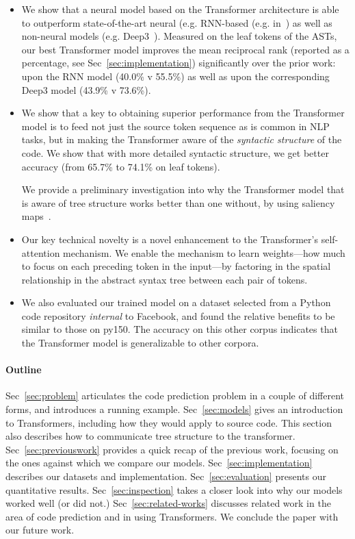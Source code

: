 \documentclass[nonacm, sigconf]{acmart}
\newcommand{\secref}[1]{Sec~\ref{#1}}
\begin{document}
\begin{itemize}
    \item We show that a neural model based on the Transformer architecture is able to outperform state-of-the-art neural (e.g. RNN-based (e.g. in~\cite{hellendoorn2017are-deep-best, karampatsis2020big-bpe}) as well as non-neural models (e.g. Deep3~\cite{raychev2016probabilistic-deep3-eth-dt}).  Measured on the leaf tokens of the ASTs, our best Transformer model improves the mean reciprocal rank (reported as a percentage, see Sec~\ref{sec:implementation}) significantly over the prior work: upon the RNN model (40.0\% v 55.5\%) as well as upon the corresponding Deep3 model (43.9\% v 73.6\%).
    
    \item We show that a key to obtaining superior performance from the Transformer model is to feed not just the source token sequence as is common in NLP tasks, but in making the Transformer aware of the \textit{syntactic structure} of the code. We show that with more detailed syntactic structure, we get better accuracy (from 65.7\% to 74.1\% on leaf tokens). 
    
    We provide a preliminary investigation into why the Transformer model that is aware of tree structure works better than one without, by using saliency maps~\cite{simonyan2013deep-saliency}.
    
    \item Our key technical novelty is a novel enhancement to the Transformer's self-attention mechanism. We enable the mechanism to learn weights---how much to focus on each preceding token in the input---by factoring in the spatial relationship in the abstract syntax tree between each pair of tokens.
    
    \item We also evaluated our trained model on a dataset selected from a Python code repository \textit{internal} to Facebook, and found the relative benefits to be similar to those on py150.  The accuracy on this other corpus indicates that the Transformer model is generalizable to other corpora. 
    
 
\end{itemize}



\paragraph{Outline} 
\secref{sec:problem} articulates the code prediction problem in a couple of different forms, and introduces a running example. 
\secref{sec:models} gives an introduction to Transformers, including how they would apply to source code. This section also describes how to communicate tree structure to the transformer. 
\secref{sec:previouswork} provides a quick recap of the previous work, focusing on the ones against which we compare our models.  
\secref{sec:implementation} describes our datasets and implementation. \secref{sec:evaluation} presents our quantitative results. \secref{sec:inspection} takes a closer look into why our models worked well (or did not.) \secref{sec:related-works} discusses related work in the area of code prediction and in using Transformers. We conclude the paper with our future work.  
 
\end{document}
